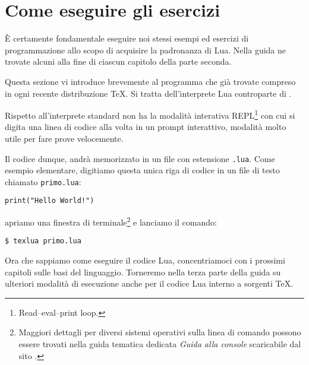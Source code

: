 

\chapter{Come eseguire gli esercizi}

È certamente fondamentale eseguire noi stessi esempi ed esercizi di
programmazione allo scopo di acquisire la padronanza di Lua. Nella guida ne
trovate alcuni alla fine di ciascun capitolo della parte seconda. 

Questa sezione vi introduce brevemente al programma  che già
trovate compreso in ogni recente distribuzione \TeX{}. Si tratta dell'interprete
Lua controparte di .

Rispetto all'interprete  standard  non ha la modalità
interativa REPL\footnote{Read–eval–print loop.} con cui si digita una linea di
codice alla volta in un prompt interattivo, modalità molto utile per fare prove
velocemente.

Il codice dunque, andrà memorizzato in un file con estensione \texttt{.lua}.
Come esempio elementare, digitiamo questa unica riga di codice in un file
di testo chiamato \texttt{primo.lua}:
\begin{Verbatim}
print("Hello World!")
\end{Verbatim}
apriamo una finestra di terminale\footnote{Maggiori dettagli per diversi sistemi
operativi sulla linea di comando possono essere trovati nella guida tematica
dedicata \emph{Guida alla console} scaricabile dal sito \GuIT.} e lanciamo il
comando:
\begin{Verbatim}[numbers=none]
$ texlua primo.lua
\end{Verbatim}

Ora che sappiamo come eseguire il codice Lua, concentriamoci con i prossimi
capitoli sulle basi del linguaggio. Torneremo nella terza parte della guida su
ulteriori modalità di esecuzione anche per il codice Lua interno a sorgenti
\TeX.


